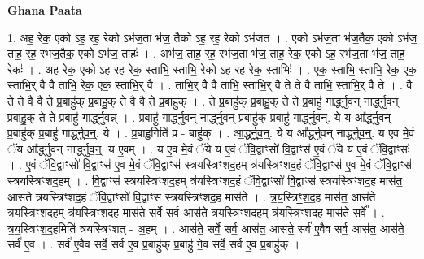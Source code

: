 \documentclass[17pt]{extarticle}
\begin{document}
\textbf{Ghana Paata } \newline

1. अह॒ रेक॒ एको ऽह॒ रह॒ रेको ऽभ॑ज॒ता भ॑ज॒ तैको ऽह॒ रह॒ रेको ऽभ॑जत । . एको ऽभ॑ज॒ता भ॑ज॒तैक॒ एको ऽभ॑ज॒ ताह॒ रह॒ रभ॑ज॒तैक॒ एको ऽभ॑ज॒ ताहः॑ । . अभ॑ज॒ ताह॒ रह॒ रभ॑ज॒ता भ॑ज॒ ताह॒ रेक॒ एको ऽह॒ रभ॑ज॒ता भ॑ज॒ ताह॒ रेकः॑ । . अह॒ रेक॒ एको ऽह॒ रह॒ रेक॒ स्ताभि॒ स्ताभि॒ रेको ऽह॒ रह॒ रेक॒ स्ताभिः॑ । . एक॒ स्ताभि॒ स्ताभि॒ रेक॒ एक॒ स्ताभि॒र् वै वै ताभि॒ रेक॒ एक॒ स्ताभि॒र् वै । . ताभि॒र् वै वै ताभि॒ स्ताभि॒र् वै ते ते वै ताभि॒ स्ताभि॒र् वै ते । . वै ते ते वै वै ते प्र॒बाहु॑क् प्र॒बाहु॒क् ते वै वै ते प्र॒बाहु॑क् । . ते प्र॒बाहु॑क् प्र॒बाहु॒क् ते ते प्र॒बाहु॑ गार्द्ध्नुवन् नार्द्ध्नुवन् प्र॒बाहु॒क् ते ते प्र॒बाहु॑ गार्द्ध्नुवन्न् । . प्र॒बाहु॑ गार्द्ध्नुवन् नार्द्ध्नुवन् प्र॒बाहु॑क् प्र॒बाहु॑ गार्द्ध्नुव॒न्॒. ये य आ᳚र्द्ध्नुवन् प्र॒बाहु॑क् प्र॒बाहु॑ गार्द्ध्नुव॒न्॒. ये । . प्र॒बाहु॒गिति॑ प्र - बाहु॑क् । . आ॒र्द्ध्नु॒व॒न्॒. ये य आ᳚र्द्ध्नुवन् नार्द्ध्नुव॒न्॒. य ए॒व मे॒वं ॅय आ᳚र्द्ध्नुवन् नार्द्ध्नुव॒न्॒. य ए॒वम् । . य ए॒व मे॒वं ॅये य ए॒वं ॅवि॒द्वाꣳसो॑ वि॒द्वाꣳस॑ ए॒वं ॅये य ए॒वं ॅवि॒द्वाꣳसः॑ । . ए॒वं ॅवि॒द्वाꣳसो॑ वि॒द्वाꣳस॑ ए॒व मे॒वं ॅवि॒द्वाꣳस॑ स्त्रयस्त्रिꣳशद॒हम् त्र॑यस्त्रिꣳशद॒हं ॅवि॒द्वाꣳस॑ ए॒व मे॒वं ॅवि॒द्वाꣳस॑ स्त्रयस्त्रिꣳशद॒हम् । . वि॒द्वाꣳस॑ स्त्रयस्त्रिꣳशद॒हम् त्र॑यस्त्रिꣳशद॒हं ॅवि॒द्वाꣳसो॑ वि॒द्वाꣳस॑ स्त्रयस्त्रिꣳशद॒ह मास॑त॒ आस॑ते त्रयस्त्रिꣳशद॒हं ॅवि॒द्वाꣳसो॑ वि॒द्वाꣳस॑ स्त्रयस्त्रिꣳशद॒ह मास॑ते । . त्र॒य॒स्त्रिꣳ॒॒श॒द॒ह मास॑त॒ आस॑ते त्रयस्त्रिꣳशद॒हम् त्र॑यस्त्रिꣳशद॒ह मास॑ते॒ सर्वे॒ सर्व॒ आस॑ते त्रयस्त्रिꣳशद॒हम् त्र॑यस्त्रिꣳशद॒ह मास॑ते॒ सर्वे᳚ । . त्र॒य॒स्त्रिꣳ॒॒श॒द॒हमिति॑ त्रयस्त्रिꣳशत् - अ॒हम् । . आस॑ते॒ सर्वे॒ सर्व॒ आस॑त॒ आस॑ते॒ सर्व॑ ए॒वैव सर्व॒ आस॑त॒ आस॑ते॒ सर्व॑ ए॒व । . सर्व॑ ए॒वैव सर्वे॒ सर्व॑ ए॒व प्र॒बाहु॑क् प्र॒बाहु॑ गे॒व सर्वे॒ सर्व॑ ए॒व प्र॒बाहु॑क् । \newline
\end{document}
